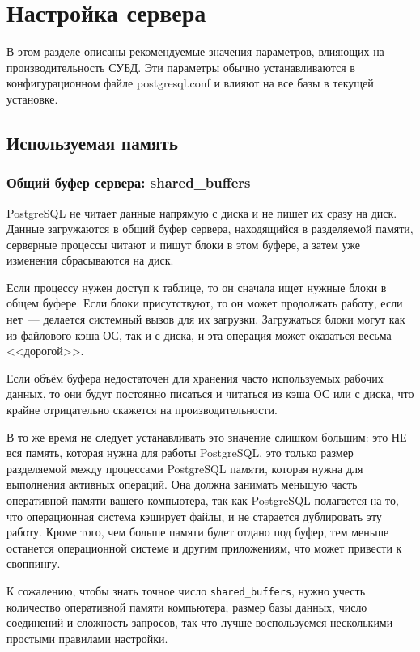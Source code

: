 \section{Настройка сервера}

В этом разделе описаны рекомендуемые значения параметров, влияющих на производительность СУБД. Эти параметры обычно устанавливаются в конфигурационном файле postgresql.conf и влияют на все базы в текущей установке.


\subsection{Используемая память}


\subsubsection{Общий буфер сервера: shared\_buffers}


PostgreSQL не читает данные напрямую с диска и не пишет их сразу на диск. Данные загружаются в общий буфер сервера, находящийся в разделяемой памяти, серверные процессы читают и пишут блоки в этом буфере, а затем уже изменения сбрасываются на диск.

Если процессу нужен доступ к таблице, то он сначала ищет нужные блоки в общем буфере. Если блоки присутствуют, то он может продолжать работу, если нет~--- делается системный вызов для их загрузки. Загружаться блоки могут как из файлового кэша ОС, так и с диска, и эта операция может оказаться весьма <<дорогой>>.

Если объём буфера недостаточен для хранения часто используемых рабочих данных, то они будут постоянно писаться и читаться из кэша ОС или с диска, что крайне отрицательно скажется на производительности.

В то же время не следует устанавливать это значение слишком большим: это НЕ вся память, которая нужна для работы PostgreSQL, это только размер разделяемой между процессами PostgreSQL памяти, которая нужна для выполнения активных операций. Она должна занимать меньшую часть оперативной памяти вашего компьютера, так как PostgreSQL полагается на то, что операционная система кэширует файлы, и не старается дублировать эту работу. Кроме того, чем больше памяти будет отдано под буфер, тем меньше останется операционной системе и другим приложениям, что может привести к своппингу.

К сожалению, чтобы знать точное число \lstinline!shared_buffers!, нужно учесть количество оперативной памяти компьютера, размер базы данных, число соединений и сложность запросов, так что лучше воспользуемся несколькими простыми правилами настройки.

